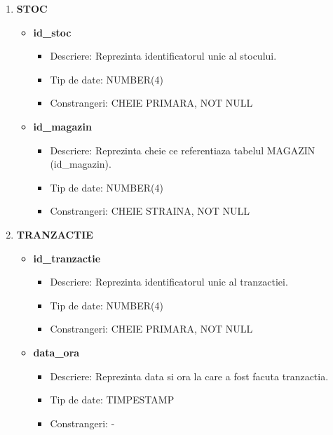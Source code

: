 \begin{enumerate}
    \vspace{0.5cm}

    \item \textbf{STOC}
    \begin{itemize}
    
        \item \textbf{id\_stoc}
                \begin{itemize}
                    \item Descriere: Reprezinta identificatorul unic al stocului.
                    \item Tip de date: NUMBER(4)
                    \item Constrangeri: CHEIE PRIMARA, NOT NULL
                \end{itemize}
                
       \item \textbf{id\_magazin}
                \begin{itemize}
                    \item Descriere: Reprezinta cheie ce referentiaza tabelul MAGAZIN (id\_magazin).
                    \item Tip de date: NUMBER(4)
                    \item Constrangeri: CHEIE STRAINA, NOT NULL
                \end{itemize}

    \end{itemize}

    \vspace{0.5cm}

    \item \textbf{TRANZACTIE}
    \begin{itemize}
    
        \item \textbf{id\_tranzactie}
                \begin{itemize}
                    \item Descriere: Reprezinta identificatorul unic al tranzactiei.
                    \item Tip de date: NUMBER(4)
                    \item Constrangeri: CHEIE PRIMARA, NOT NULL
                \end{itemize}
                
       \item \textbf{data\_ora}
                \begin{itemize}
                    \item Descriere: Reprezinta data si ora la care a fost facuta tranzactia.
                    \item Tip de date: TIMPESTAMP
                    \item Constrangeri: -
                \end{itemize}


\end{itemize}
\end{enumerate}
